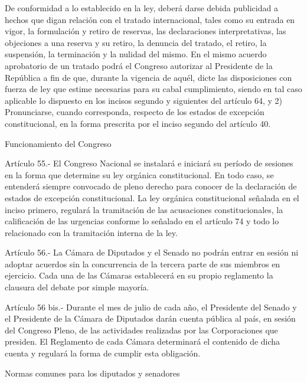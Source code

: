     De conformidad a lo establecido en la ley, deberá darse debida publicidad a hechos que digan relación con el tratado internacional, tales como su entrada en vigor, la formulación y retiro de reservas, las declaraciones interpretativas, las objeciones a una reserva y su retiro, la denuncia del tratado, el retiro, la suspensión, la terminación y la nulidad del mismo.
    En el mismo acuerdo aprobatorio de un tratado podrá el Congreso autorizar al Presidente de la República a fin de que, durante la vigencia de aquél, dicte las disposiciones con fuerza de ley que estime necesarias para su cabal cumplimiento, siendo en tal caso aplicable lo dispuesto en los incisos segundo y siguientes del artículo 64, y
    2) Pronunciarse, cuando corresponda, respecto de los estados de excepción constitucional, en la forma prescrita por el inciso segundo del artículo 40.



    Funcionamiento del Congreso



    Artículo 55.- El Congreso Nacional se instalará e iniciará su período de sesiones en la forma que determine su ley orgánica constitucional.
    En todo caso, se entenderá siempre convocado de pleno derecho para conocer de la declaración de estados de excepción constitucional.
    La ley orgánica constitucional señalada en el inciso primero, regulará la tramitación de las acusaciones constitucionales, la calificación de las urgencias conforme lo señalado en el artículo 74 y todo lo relacionado con la tramitación interna de la ley.



    Artículo 56.- La Cámara de Diputados y el Senado no podrán entrar en sesión ni adoptar acuerdos sin la concurrencia de la tercera parte de sus miembros en ejercicio.
    Cada una de las Cámaras establecerá en su propio reglamento la clausura del debate por simple mayoría.



    Artículo 56 bis.- Durante el mes de julio de cada año, el Presidente del Senado y el Presidente de la Cámara de Diputados darán cuenta pública al país, en sesión del Congreso Pleno, de las actividades realizadas por las Corporaciones que presiden.
    El Reglamento de cada Cámara determinará el contenido de dicha cuenta y regulará la forma de cumplir esta obligación.


    Normas comunes para los diputados y senadores



